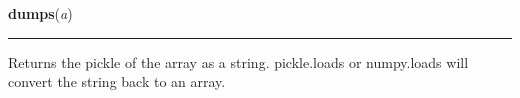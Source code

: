     \label{numpy:ndarray:dumps}

    \vspace{0.5ex}

    \begin{boxedminipage}{\textwidth}

    \raggedright \textbf{dumps}(\textit{a})

    \vspace{-1.5ex}

    \rule{\textwidth}{0.5\fboxrule}

Returns the pickle of the array as a string.
pickle.loads or numpy.loads will convert the string back to an array.
    \vspace{1ex}

    \end{boxedminipage}

    \label{numpy:ndarray:fill}

    \vspace{0.5ex}

